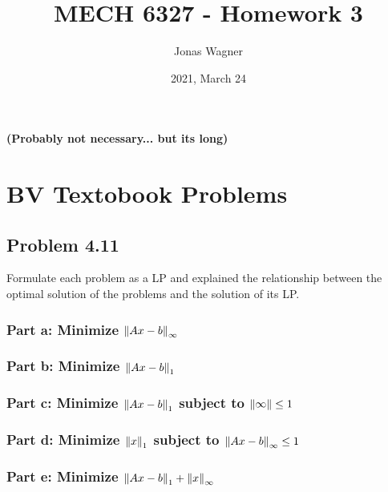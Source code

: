 \documentclass[letter]{article}
\title{MECH 6327 - Homework 3}
\author{Jonas Wagner}
\date{2021, March 24}
\begin{document}
\maketitle

\newpage
\textbf{(Probably not necessary... but its long)}
\tableofcontents



\newpage
\section*{BV Textobook Problems}
\subsection{Problem 4.11}
Formulate each problem as a LP and explained the relationship between the optimal solution of the problems and the solution of its LP.
\subsubsection{Part a: Minimize $\norm{Ax-b}_\infty$}






\subsubsection{Part b: Minimize $\norm{Ax-b}_1$}







\subsubsection{Part c: Minimize $\norm{Ax-b}_1$ subject to $\norm{\infty}\leq 1$}







\subsubsection{Part d: Minimize $\norm{x}_1$ subject to $\norm{Ax-b}_\infty \leq 1$}





\subsubsection{Part e: Minimize $\norm{Ax-b}_1 + \norm{x}_\infty$}
\end{document}
